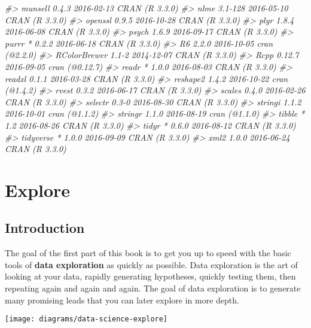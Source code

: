 \documentclass[]{book}
\newenvironment{Shaded}{\begin{snugshade}}{\end{snugshade}}
\newcommand{\CommentTok}[1]{\textcolor[rgb]{0.56,0.35,0.01}{\textit{{#1}}}}
\begin{document}
\begin{Shaded}
\begin{Highlighting}[]
\CommentTok{#>  munsell        0.4.3    2016-02-13 CRAN (R 3.3.0)}
\CommentTok{#>  nlme           3.1-128  2016-05-10 CRAN (R 3.3.0)}
\CommentTok{#>  openssl        0.9.5    2016-10-28 CRAN (R 3.3.0)}
\CommentTok{#>  plyr           1.8.4    2016-06-08 CRAN (R 3.3.0)}
\CommentTok{#>  psych          1.6.9    2016-09-17 CRAN (R 3.3.0)}
\CommentTok{#>  purrr        * 0.2.2    2016-06-18 CRAN (R 3.3.0)}
\CommentTok{#>  R6             2.2.0    2016-10-05 cran (@2.2.0) }
\CommentTok{#>  RColorBrewer   1.1-2    2014-12-07 CRAN (R 3.3.0)}
\CommentTok{#>  Rcpp           0.12.7   2016-09-05 cran (@0.12.7)}
\CommentTok{#>  readr        * 1.0.0    2016-08-03 CRAN (R 3.3.0)}
\CommentTok{#>  readxl         0.1.1    2016-03-28 CRAN (R 3.3.0)}
\CommentTok{#>  reshape2       1.4.2    2016-10-22 cran (@1.4.2) }
\CommentTok{#>  rvest          0.3.2    2016-06-17 CRAN (R 3.3.0)}
\CommentTok{#>  scales         0.4.0    2016-02-26 CRAN (R 3.3.0)}
\CommentTok{#>  selectr        0.3-0    2016-08-30 CRAN (R 3.3.0)}
\CommentTok{#>  stringi        1.1.2    2016-10-01 cran (@1.1.2) }
\CommentTok{#>  stringr        1.1.0    2016-08-19 cran (@1.1.0) }
\CommentTok{#>  tibble       * 1.2      2016-08-26 CRAN (R 3.3.0)}
\CommentTok{#>  tidyr        * 0.6.0    2016-08-12 CRAN (R 3.3.0)}
\CommentTok{#>  tidyverse    * 1.0.0    2016-09-09 CRAN (R 3.3.0)}
\CommentTok{#>  xml2           1.0.0    2016-06-24 CRAN (R 3.3.0)}
\end{Highlighting}
\end{Shaded}

\part{Explore}\label{part-explore}


\chapter{Introduction}\label{explore-intro}

The goal of the first part of this book is to get you up to speed with
the basic tools of \textbf{data exploration} as quickly as possible.
Data exploration is the art of looking at your data, rapidly generating
hypotheses, quickly testing them, then repeating again and again and
again. The goal of data exploration is to generate many promising leads
that you can later explore in more depth.

\begin{center}\texttt{[image: diagrams/data-science-explore]} \end{center}
\end{document}
